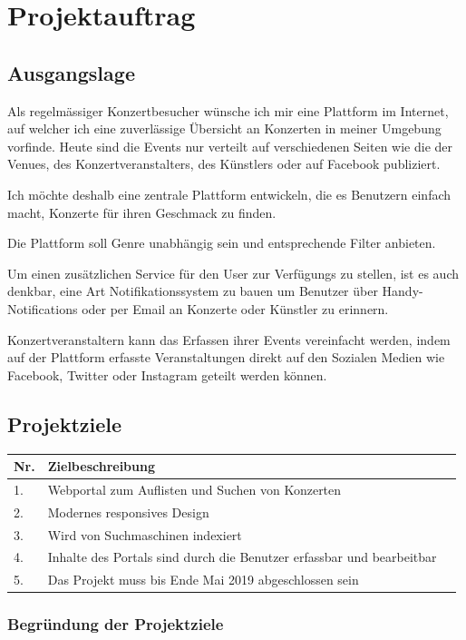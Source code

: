 \chapter{Projektauftrag}

\label{AppendixProjektauftrag}

\section{Ausgangslage}\label{ausgangslage}

Als regelmässiger Konzertbesucher wünsche ich mir eine Plattform im
Internet, auf welcher ich eine zuverlässige Übersicht an Konzerten in
meiner Umgebung vorfinde. Heute sind die Events nur verteilt auf
verschiedenen Seiten wie die der Venues, des Konzertveranstalters, des
Künstlers oder auf Facebook publiziert.

Ich möchte deshalb eine zentrale Plattform entwickeln, die es Benutzern
einfach macht, Konzerte für ihren Geschmack zu finden.

Die Plattform soll Genre unabhängig sein und entsprechende Filter
anbieten.

Um einen zusätzlichen Service für den User zur Verfügungs zu stellen,
ist es auch denkbar, eine Art Notifikationssystem zu bauen um Benutzer
über Handy-Notifications oder per Email an Konzerte oder Künstler zu
erinnern.

Konzertveranstaltern kann das Erfassen ihrer Events vereinfacht werden,
indem auf der Plattform erfasste Veranstaltungen direkt auf den Sozialen
Medien wie Facebook, Twitter oder Instagram geteilt werden können.

\section{Projektziele}\label{projektziele}

\begin{longtable}[]{@{}lll@{}}
  \toprule
  Nr. & Zielbeschreibung\tabularnewline
  \midrule
  1.  & Webportal zum Auflisten und Suchen von Konzerten\tabularnewline
  2.  & Modernes responsives Design\tabularnewline
  3.  & Wird von Suchmaschinen indexiert\tabularnewline
  4.  & Inhalte des Portals sind durch die Benutzer erfassbar und bearbeitbar\tabularnewline
  5.  & Das Projekt muss bis Ende Mai 2019 abgeschlossen sein\tabularnewline
  \bottomrule
\end{longtable}

\subsection{Begründung der
  Projektziele}\label{begruxfcndung-der-projektziele}


